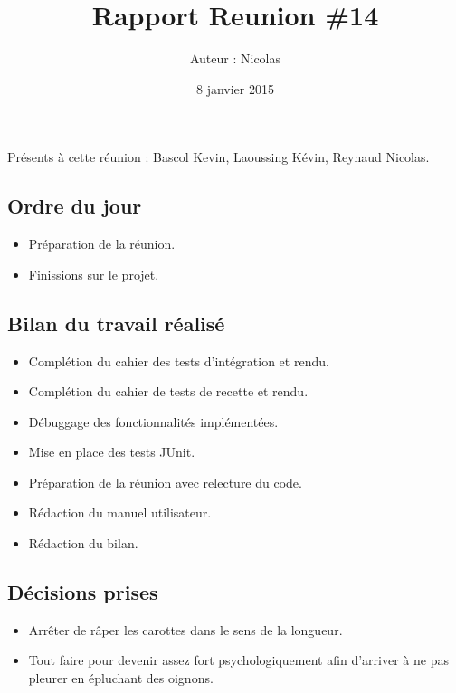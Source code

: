 \documentclass[12pt,a4paper]{article}
\title{Rapport Reunion \#14}
\author{Auteur : Nicolas \bsc{REYNAUD}}
\date{8 janvier 2015}
\begin{document}
\maketitle

\newpage

Présents à cette réunion : Bascol Kevin, Laoussing Kévin, Reynaud Nicolas.

\subsection*{Ordre du jour}
\begin{itemize}[label = $\blacktriangleright$]
\item Préparation de la réunion.
\item Finissions sur le projet.
\end{itemize}

\subsection*{Bilan du travail réalisé}

\begin{itemize}[label = $\blacktriangleright$]
\item Complétion du cahier des tests d'intégration et rendu.

\item Complétion du cahier de tests de recette et rendu.

\item Débuggage des fonctionnalités implémentées.

\item Mise en place des tests JUnit.

\item Préparation de la réunion avec relecture du code.

\item Rédaction du manuel utilisateur.

\item Rédaction du bilan.
\end{itemize}


\subsection*{Décisions prises}

\begin{itemize}[label = $\blacktriangleright$] 
\item Arrêter de râper les carottes dans le sens de la longueur.
\item Tout faire pour devenir assez fort psychologiquement afin d'arriver à ne pas pleurer en épluchant des oignons.
\end{itemize}
\end{document}
